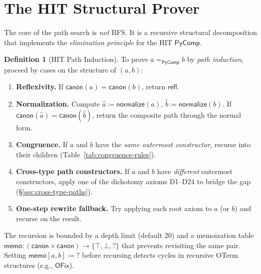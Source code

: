 \documentclass[11pt,a4paper]{report}
\theoremstyle{definition}
\newtheorem{definition}{Definition}[chapter]
\theoremstyle{plain}
\begin{document}
\section{The HIT Structural Prover}
\label{sec:hit-structural}

The core of the path search is \emph{not} BFS.  It is a recursive
structural decomposition that implements the \emph{elimination
principle} for the HIT $\mathsf{PyComp}$.

\begin{definition}[HIT Path Induction]
\label{def:hit-path-induction}
To prove $a =_{\mathsf{PyComp}} b$ by \emph{path induction}, proceed
by cases on the structure of $(a, b)$:
\begin{enumerate}
  \item \textbf{Reflexivity.} If $\mathsf{canon}(a) = \mathsf{canon}(b)$,
    return $\mathsf{refl}$.
  \item \textbf{Normalization.} Compute $\hat{a} \coloneqq
    \mathsf{normalize}(a)$, $\hat{b} \coloneqq \mathsf{normalize}(b)$.
    If $\mathsf{canon}(\hat a) = \mathsf{canon}(\hat b)$, return
    the composite path through the normal form.
  \item \textbf{Congruence.} If $a$ and $b$ have the \emph{same
    outermost constructor}, recurse into their children
    (Table~\ref{tab:congruence-rules}).
  \item \textbf{Cross-type path constructors.} If $a$ and $b$ have
    \emph{different} outermost constructors, apply one of the
    dichotomy axioms D1--D24 to bridge the gap
    (\S\ref{sec:cross-type-paths}).
  \item \textbf{One-step rewrite fallback.} Try applying each
    root axiom to $a$ (or $b$) and recurse on the result.
\end{enumerate}
The recursion is bounded by a depth limit (default 20) and a
memoization table $\mathsf{memo} : (\mathsf{canon} \times
\mathsf{canon}) \to \{\top, \bot, ?\}$ that prevents revisiting
the same pair.  Setting $\mathsf{memo}[a,b] \coloneqq {?}$ before
recursing detects cycles in recursive OTerm structures (e.g.,
$\mathsf{OFix}$).
\end{definition}
\end{document}
